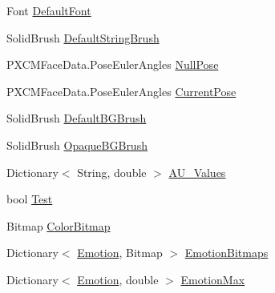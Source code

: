 \begin{DoxyCompactItemize}
Font \hyperlink{class_real_sense_1_1_model_a1e12c6ceac3f412e6b452148b1a97bb1}{Default\+Font}
\item 
Solid\+Brush \hyperlink{class_real_sense_1_1_model_aaee076946f30b272e403d39afe033b4e}{Default\+String\+Brush}
\item 
P\+X\+C\+M\+Face\+Data.\+Pose\+Euler\+Angles \hyperlink{class_real_sense_1_1_model_af6cb31aea9e1e0fd3ef87c9380e92193}{Null\+Pose}
\item 
P\+X\+C\+M\+Face\+Data.\+Pose\+Euler\+Angles \hyperlink{class_real_sense_1_1_model_a5d30cb7ac89ab7528623a695056096c4}{Current\+Pose}
\item 
Solid\+Brush \hyperlink{class_real_sense_1_1_model_a05161bcafb94b553304268ab16861a84}{Default\+B\+G\+Brush}
\item 
Solid\+Brush \hyperlink{class_real_sense_1_1_model_a14272eb96159aac12a818e2e15c36cb0}{Opaque\+B\+G\+Brush}
\item 
Dictionary$<$ String, double $>$ \hyperlink{class_real_sense_1_1_model_a5a20efa42d5391f0a8156d45f676fc34}{A\+U\+\_\+\+Values}
\item 
bool \hyperlink{class_real_sense_1_1_model_a89f4614b0f880fb6553ebcea3d2e6a6c}{Test}
\item 
Bitmap \hyperlink{class_real_sense_1_1_model_a6b3603d17577660f65fc7bbb6b097182}{Color\+Bitmap}
\item 
Dictionary$<$ \hyperlink{class_real_sense_1_1_model_a5bf3fde8f53519f7a740d8b4e0399208}{Emotion}, Bitmap $>$ \hyperlink{class_real_sense_1_1_model_a654d0ac6e4e49b884fd3e166039c7bc4}{Emotion\+Bitmaps}
\item 
Dictionary$<$ \hyperlink{class_real_sense_1_1_model_a5bf3fde8f53519f7a740d8b4e0399208}{Emotion}, double $>$ \hyperlink{class_real_sense_1_1_model_ac5454f63dfead405cd1d9c229cf6790f}{Emotion\+Max}

\end{DoxyCompactItemize}
